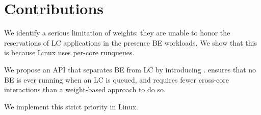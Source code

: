 \section{Contributions}

We identify a serious limitation of \cgroups{} weights: they are unable to honor
the reservations of LC applications in the presence BE workloads. We show that
this is because Linux uses per-core runqueues.

We propose an API that separates BE from LC by introducing \beclass{}.
\beclass{} ensures that no BE is ever running when an LC is queued, and requires
fewer cross-core interactions than a weight-based approach to do so.

We implement this strict priority in Linux.
